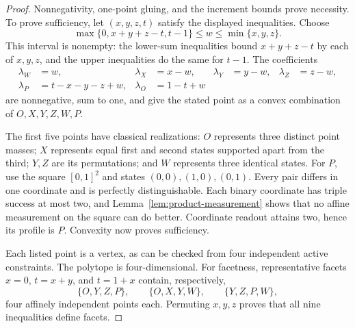 \documentclass[a4paper,11pt,onecolumn,unpublished]{quantumarticle}
\theoremstyle{definition}
\newcommand{\1}{\mathbf 1}
\begin{document}
\begin{proof}
Nonnegativity, one-point gluing, and the increment bounds prove necessity.
To prove sufficiency, let $(x,y,z,t)$ satisfy the displayed inequalities.
Choose
\[
 \max\{0,x+y+z-t,t-1\}\le w\le\min\{x,y,z\}.
\]
This interval is nonempty: the lower-sum inequalities bound $x+y+z-t$ by each
of $x,y,z$, and the upper inequalities do the same for $t-1$. The coefficients
\begin{align*}
 \lambda_W&=w,&\lambda_X&=x-w,&\lambda_Y&=y-w,&\lambda_Z&=z-w,\\
 \lambda_P&=t-x-y-z+w,&\lambda_O&=1-t+w
\end{align*}
are nonnegative, sum to one, and give the stated point as a convex combination
of $O,X,Y,Z,W,P$.

The first five points have classical realizations: $O$ represents three
distinct point masses; $X$ represents equal first and second states supported
apart from the third; $Y,Z$ are its permutations; and $W$ represents three
identical states. For $P$, use the square $[0,1]^2$ and states
$(0,0),(1,0),(0,1)$. Every pair differs in one coordinate and is perfectly
distinguishable. Each binary coordinate has triple success at most two, and
Lemma~\ref{lem:product-measurement} shows that no affine measurement on the
square can do better. Coordinate readout attains two, hence its profile is $P$.
Convexity now proves sufficiency.

Each listed point is a vertex, as can be checked from four independent active
constraints. The polytope is four-dimensional. For facetness, representative
facets $x=0$, $t=x+y$, and $t=1+x$ contain, respectively,
\[
 \{O,Y,Z,P\},\qquad\{O,X,Y,W\},\qquad\{Y,Z,P,W\},
\]
four affinely independent points each. Permuting $x,y,z$ proves that all nine
inequalities define facets.
\end{proof}
\end{document}
